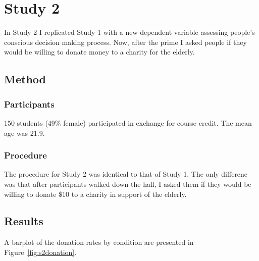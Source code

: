 \documentclass[a4paper,man,natbib,floatsintext]{apa6}\usepackage[]{graphicx}\usepackage[]{color}
\begin{document}
\section{Study 2}

In Study 2 I replicated Study 1 with a new dependent variable assessing people's conscious decision making process. Now, after the prime I asked people if they would be willing to donate money to a charity for the elderly.

\subsection{Method}


\subsubsection{Participants}

150 students (49\% female) participated in exchange for course credit. The mean age was 21.9.

\subsubsection{Procedure}

The procedure for Study 2 was identical to that of Study 1. The only differene was that after participants walked down the hall, I asked them if they would be willing to donate \$10 to a charity in support of the elderly.

\subsection{Results}

 A barplot of the donation rates by condition are presented in Figure~\ref{fig:s2donation}.
\end{document}
